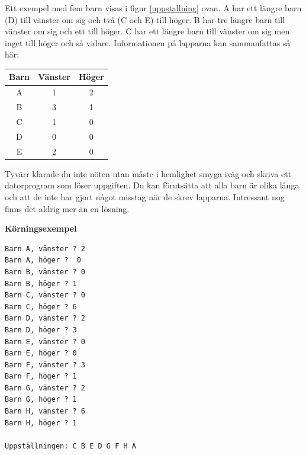 \documentclass[a4paper,12pt]{article}
\begin{document}
Ett exempel med fem barn visas i figur \ref{uppstallning} ovan. A har ett längre barn (D) till vänster om sig och två (C och E) till höger. B har tre längre barn till vänster om sig och ett till höger. C har ett längre barn till vänster om sig men inget till höger och så vidare. Informationen på lapparna kan sammanfattas så här:

\begin{center}
  \begin{tabular}{ c | c | c }
Barn& Vänster & Höger \\ \hline
A	& 1 	  & 2     \\
B	& 3 	  & 1     \\
C	& 1 	  & 0     \\
D	& 0 	  & 0     \\
E	& 2 	  & 0     \\
  \end{tabular}
\end{center}

Tyvärr klarade du inte nöten utan måste i hemlighet smyga iväg och skriva ett datorprogram som löser uppgiften. Du kan förutsätta att alla barn är olika långa och att de inte har gjort något misstag när de skrev lapparna. Intressant nog finns det aldrig mer än en lösning. 


\textbf{Körningsexempel}
\begin{lstlisting}
Barn A, vänster ? 2
Barn A, höger ?  0
Barn B, vänster ? 0
Barn B, höger ? 1
Barn C, vänster ? 0
Barn C, höger ? 6
Barn D, vänster ? 2
Barn D, höger ? 3
Barn E, vänster ? 0
Barn E, höger ? 0
Barn F, vänster ? 3
Barn F, höger ? 1
Barn G, vänster ? 2
Barn G, höger ? 1
Barn H, vänster ? 6
Barn H, höger ? 1

Uppställningen: C B E D G F H A 
\end{lstlisting}
\end{document}
